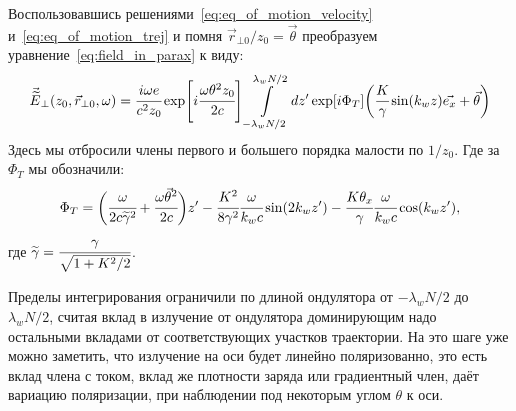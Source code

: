 \documentclass[14pt,a4paper]{extarticle}
\numberwithin{equation}{section}
\begin{document}
Воспользовавшись решениями~\ref{eq:eq_of_motion_velocity} и~\ref{eq:eq_of_motion_trej} и помня $\vec{r}_{\bot 0}/z_0 = \vec{\theta}$ преобразуем уравнение~\ref{eq:field_in_parax} к виду:
\begin{equation}
	\label{eq:field_in_parax}
	\begin{array}{lcl}
		\vec{\widetilde{E}}_{\bot}(z_0,  \vec{r}_{\bot 0}, \omega) =
		\cfrac{i\omega e}{c^2z_0} \exp[i\cfrac{\omega \theta^2 z_0}{2c}]
	 	\displaystyle\int\limits_{-\lambda_w N/2}^{\lambda_w N/2} dz'\exp[i\Phi_T]
		\bigg(\cfrac{K}{\gamma}\sin(k_w z)\vec{e_x} + \vec{\theta}\bigg)
	\end{array}	
\end{equation}
Здесь мы отбросили члены первого и большего порядка малости по $1/z_0$. Где за $\Phi_T$ мы обозначили:
\begin{equation}
	\Phi_T = 
	\bigg(\cfrac{\omega}{2c\widetilde{\gamma}^2} + 
	\cfrac{\omega\vec{\theta}^2}{2c}\bigg)z' - 
	\cfrac{K^2}{8\gamma^2}\cfrac{\omega}{k_w c}\sin(2k_wz') - \cfrac{K{\theta_x}}{\gamma}\cfrac{\omega}{k_w c}\cos(k_w z'),
\end{equation}
где $\widetilde{\gamma} = \cfrac{\gamma}{\sqrt{1 + K^2/2}}$.

Пределы интегрирования ограничили по длиной ондулятора от $-\lambda_w N/2$ до $\lambda_w N/2$, считая вклад в излучение от ондулятора доминирующим надо остальными вкладами от соответствующих участков траектории. На это шаге уже можно заметить, что излучение на оси будет линейно поляризованно, это есть вклад члена с током, вклад же плотности заряда или градиентный член, даёт вариацию поляризации, при наблюдении под некоторым углом $\theta$ к оси.
\end{document}
